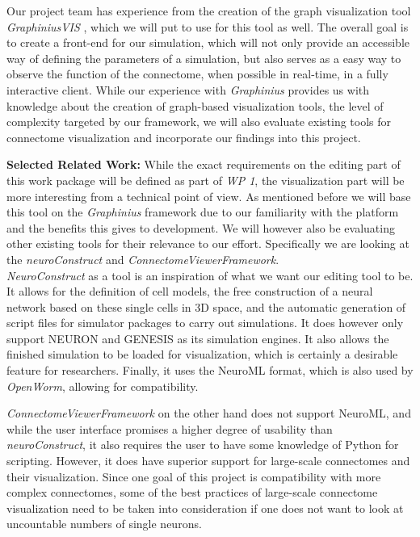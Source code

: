 \documentclass[a4paper,11pt]{article}
\begin{document}
Our project team has experience from the creation of the graph visualization tool \emph{GraphiniusVIS} , which we will put to use for this tool as well. The overall goal is to create a front-end for our simulation, which will not only provide an accessible way of defining the parameters of a simulation, but also serves as a easy way to observe the function of the connectome, when possible in real-time, in a fully interactive client. While our experience with \emph{Graphinius} provides us with knowledge about the creation of graph-based visualization tools, the level of complexity targeted by our framework, we will also evaluate existing tools for connectome visualization and incorporate our findings into this project.

\textbf{Selected Related Work:}
While the exact requirements on the editing part of this work package will be defined as part of \emph{WP 1}, the visualization part will be more interesting from a technical point of view.
As mentioned before we will base this tool on the \emph{Graphinius} framework  due to our familiarity with the platform and the benefits this gives to development.  We will however also be evaluating other existing tools for their relevance to our effort. Specifically we are looking at the \emph{neuroConstruct} and \emph{ConnectomeViewerFramework}.\\

\emph{NeuroConstruct} \citep{Gleeson2007} as a tool is an inspiration of what we want our editing tool to be. It allows for the definition of cell models, the free construction of a neural network based on these single cells in 3D space, and the automatic generation of script files for simulator packages to carry out simulations. It does however only support NEURON \citep{Hines1994} and GENESIS \citep{Bower2003} as its simulation engines. It also allows the finished simulation to be loaded for visualization, which is certainly a desirable feature for researchers. Finally, it uses the NeuroML format, which is also used by \emph{OpenWorm}, allowing for compatibility. 

\emph{ConnectomeViewerFramework} \citep{Gerhard2011} on the other hand does not support NeuroML, and while the user interface promises a higher degree of usability than \emph{neuroConstruct}, it also requires the user to have some knowledge of Python for scripting. However, it does have superior support for large-scale connectomes and their visualization. Since one goal of this project is compatibility with more complex connectomes, some of the best practices of large-scale connectome visualization need to be taken into consideration if one does not want to look at uncountable numbers of single neurons. 
\\[0,2cm]
\end{document}
